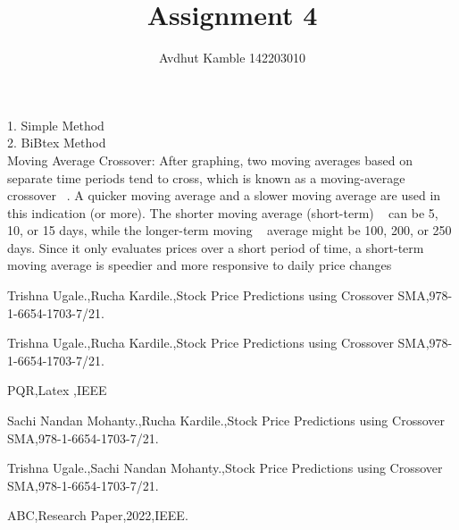 \documentclass[11pt,a4paper]{report}
\author{Avdhut Kamble 142203010}
\title{Assignment 4}
\begin{document}
	\maketitle
	
	1. Simple Method\\
	
	2. BiBtex Method\\
	
	Moving Average Crossover: After graphing, two 
	moving averages based on separate time periods tend to cross, 
	which is known as a moving-average crossover ~\cite{abc}. A quicker 
	moving average and a slower moving average are used in this 
	indication (or more). The shorter moving average (short-term) ~\cite{pqr}
	can be 5, 10, or 15 days, while the longer-term moving ~\cite{aa,trishna}
	average might be 100, 200, or 250 days. Since it only 
	evaluates prices over a short period of time, a short-term 
	moving average is speedier and more responsive to daily 
	price changes ~\cite{trishna,sachi,rucha}
	
	
	\begin{thebibliography} {}
		
		Trishna Ugale.,Rucha Kardile.,Stock Price Predictions using Crossover SMA,978-1-6654-1703-7/21.
		
		 Trishna Ugale.,Rucha Kardile.,Stock Price Predictions using Crossover SMA,978-1-6654-1703-7/21.
		
		 PQR,Latex ,IEEE
		
		 Sachi Nandan Mohanty.,Rucha Kardile.,Stock Price Predictions using Crossover SMA,978-1-6654-1703-7/21.
		
		 Trishna Ugale.,Sachi Nandan Mohanty.,Stock Price Predictions using Crossover SMA,978-1-6654-1703-7/21.
		
		 ABC,Research Paper,2022,IEEE.
		
		
		
	\end{thebibliography} 
	
\end{document}
